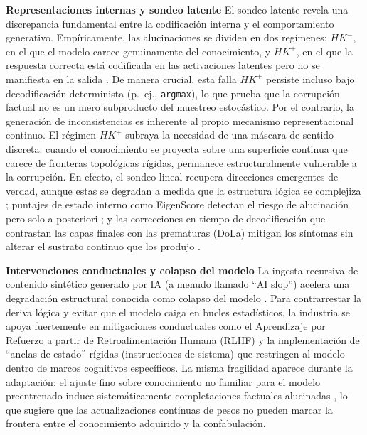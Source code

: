 \documentclass{article}
\begin{document}
\textbf{Representaciones internas y sondeo latente} El sondeo latente
revela una discrepancia fundamental entre la codificación interna y el
comportamiento generativo. Empíricamente, las alucinaciones se dividen
en dos regímenes: \(HK^{-}\), en el que el modelo carece genuinamente
del conocimiento, y \(HK^{+}\), en el que la respuesta correcta está
codificada en las activaciones latentes pero no se manifiesta en la
salida \citep{orgad2025iclr, simhi2024distinguishing}. De manera
crucial, esta falla \(HK^{+}\) persiste incluso bajo decodificación
determinista (p.~ej., \texttt{argmax}), lo que prueba que la corrupción
factual no es un mero subproducto del muestreo estocástico. Por el
contrario, la generación de inconsistencias es inherente al propio
mecanismo representacional continuo. El régimen \(HK^{+}\) subraya la
necesidad de una máscara de sentido discreta: cuando el conocimiento se
proyecta sobre una superficie continua que carece de fronteras
topológicas rígidas, permanece estructuralmente vulnerable a la
corrupción. En efecto, el sondeo lineal recupera direcciones emergentes
de verdad, aunque estas se degradan a medida que la estructura lógica se
complejiza \citep{marks2024}; puntajes de estado interno como EigenScore
detectan el riesgo de alucinación pero solo a posteriori
\citep{chen2024}; y las correcciones en tiempo de decodificación que
contrastan las capas finales con las prematuras (DoLa) mitigan los
síntomas sin alterar el sustrato continuo que los produjo
\citep{chuang2024}.

\textbf{Intervenciones conductuales y colapso del modelo} La ingesta
recursiva de contenido sintético generado por IA (a menudo llamado ``AI
slop'') acelera una degradación estructural conocida como colapso del
modelo \citep{shumailov2024, kommers2025slop}. Para contrarrestar la
deriva lógica y evitar que el modelo caiga en bucles estadísticos, la
industria se apoya fuertemente en mitigaciones conductuales como el
Aprendizaje por Refuerzo a partir de Retroalimentación Humana (RLHF) y
la implementación de ``anclas de estado'' rígidas (instrucciones de
sistema) que restringen al modelo dentro de marcos cognitivos
específicos. La misma fragilidad aparece durante la adaptación: el
ajuste fino sobre conocimiento no familiar para el modelo preentrenado
induce sistemáticamente completaciones factuales alucinadas
\citep{gekhman2024, kang2025}, lo que sugiere que las actualizaciones
continuas de pesos no pueden marcar la frontera entre el conocimiento
adquirido y la confabulación.
\end{document}
